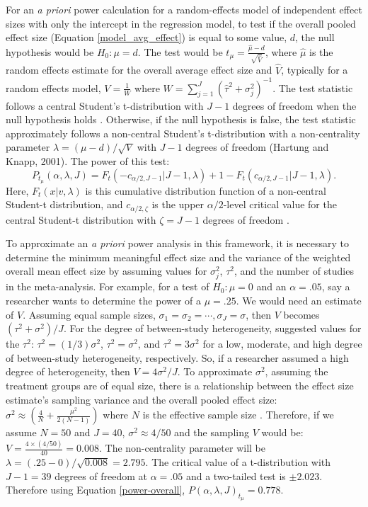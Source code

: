 For an \textit{a priori} power calculation for a random-effects model of independent effect sizes with only the intercept in the regression model, to test if the overall pooled effect size (Equation \ref{model_avg_effect}) is equal to some value, $d$, the null hypothesis would be $H_0: \mu=d$. The test would be $t_{\mu} = \frac{\hat{\mu}-d}{\sqrt{\hat{V}}}$,
 where $\hat{\mu}$ is the random effects estimate for the overall average effect size and $\hat{V}$, typically for a random effects model, $V = \frac{1}{W}$ where $W = \sum_{j=1}^J (\hat{\tau}^2 + \sigma^2_j)^{-1}$. The test statistic follows a central Student's t-distribution with $J-1$ degrees of freedom when the null hypothesis holds \autocite{hedges2001, vembye2023}. Otherwise, if the null hypothesis is false, the test statistic approximately follows a non-central Student's t-distribution with a non-centrality parameter $\lambda = (\mu - d)/\sqrt{V}$ with $J-1$ degrees of freedom (Hartung and Knapp, 2001). The power of this test:   
\begin{equation} \label{power-overall}
   P_{t_{\mu}}(\alpha, \lambda, J) =  F_t(-c_{\alpha/2, J-1}|J-1,\lambda) + 1- F_t(c_{\alpha/2, J-1}|J-1,\lambda).
\end{equation}
Here, $F_t(x|v,\lambda)$ is this cumulative distribution function of a non-central Student-t distribution, and $c_{\alpha/2,\zeta}$ is the upper $\alpha/2$-level critical value for the central Student-t distribution with $\zeta = J-1$ degrees of freedom \autocite{vembye2023, hedges2001}. 

To approximate an \textit{a priori} power analysis in this framework, it is necessary to determine the minimum meaningful effect size and the variance of the weighted overall mean effect size by assuming values for $\sigma_j^2$, $\tau^2$, and the number of studies in the meta-analysis. For example, for a test of $H_0: \mu = 0$ and an $\alpha = .05$, say a researcher wants to determine the power of a $\mu = .25$. We would need an estimate of $V$. Assuming equal sample sizes, $\sigma_1 = \sigma_2 = \cdots, \sigma_J = \sigma$, then $V$ becomes $(\tau^2 +\sigma^2)/J$. For the degree of between-study heterogeneity, \textcite{pigott2012} suggested values for the $\tau^2$: $\tau^2 = (1/3)\sigma^2$, $\tau^2 = \sigma^2$, and $\tau^2 = 3\sigma^2$ for a low, moderate, and high degree of between-study heterogeneity, respectively. So, if a researcher assumed a high degree of heterogeneity, then $V= 4\sigma^2/J$. To approximate $\sigma^2$, assuming the treatment groups are of equal size, there is a relationship between the effect size estimate's sampling variance and the overall pooled effect size: $\sigma^2 \approx (\frac{4}{N} + \frac{\mu^2}{2(N-1)})$ where $N$ is the effective sample size \autocite{valentine2010}. Therefore, if we assume $N = 50$ and $J= 40$, $\sigma^2 \approx 4/50$ and the sampling $V$ would be: $V = \frac{4 \times (4/50)}{40} = 0.008$. The non-centrality parameter will be $\lambda = (.25 - 0)/ \sqrt{0.008} = 2.795$. The critical value of a t-distribution with $J-1 = 39$ degrees of freedom at $\alpha=.05$ and a two-tailed test is $ \pm 2.023$. Therefore using Equation \ref{power-overall}, $P(\alpha, \lambda, J)_{t_{\mu}} = 0.778$.
 
